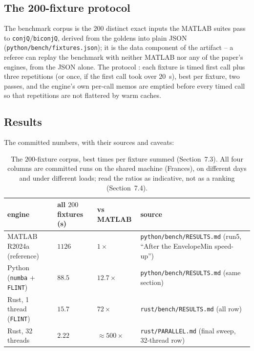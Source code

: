 \documentclass[11pt]{article}
\theoremstyle{definition}
\begin{document}
\subsection{The 200-fixture protocol}

The benchmark corpus is the $200$ distinct exact inputs the MATLAB suites pass
to \texttt{conjQ}/\texttt{biconjQ}, derived from the goldens into plain JSON
(\texttt{python/bench/fixtures.json}); it is the data component of the
artifact -- a referee can replay the benchmark with neither MATLAB nor any of
the paper's engines, from the JSON alone.
The protocol
: each fixture is timed
first call plus three repetitions (or once, if the first call took over $20$~s),
best per fixture, two passes, and the engine's own per-call memos are emptied
before every timed call so that repetitions are not flattered by warm caches.

\subsection{Results}

The committed numbers, with their sources and caveats:

\begin{table}[t]
\centering
\begin{tabular}{p{4.2cm}p{3.1cm}p{1.9cm}p{5.7cm}}
\toprule
engine & all $200$ fixtures (s) & vs MATLAB & source \\
\midrule
MATLAB R2024a (reference) & $1126$ & $1\times$ &
 \texttt{python/bench/RESULTS.md} (run5, ``After the EnvelopeMin speed-up'') \\
 Python (\texttt{numba} + \texttt{FLINT}) & $88.5$ & $12.7\times$ &
 \texttt{python/bench/RESULTS.md} (same section) \\
 Rust, 1 thread (\texttt{FLINT}) & $15.7$ & $72\times$ &
 \texttt{rust/bench/RESULTS.md} (all row) \\
 Rust, 32 threads & $2.22$ & $\approx 500\times$ &
 \texttt{rust/PARALLEL.md} (final sweep, 32-thread row) \\
\bottomrule
\end{tabular}
\caption{The $200$-fixture corpus, best times per fixture summed
(Section~7.3). All four columns are committed runs on the shared machine
(Frances), on different days and under different loads; read the ratios as
indicative, not as a ranking (Section~7.4).}
\label{tab:speed}
\end{table}
\end{document}
